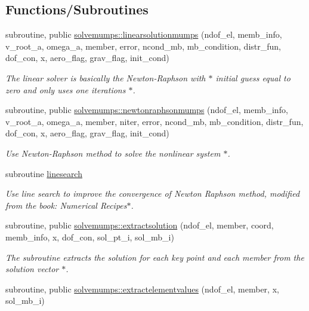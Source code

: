 \subsection*{Functions/\+Subroutines}
\begin{DoxyCompactItemize}
\item 
subroutine, public \hyperlink{namespacesolvemumps_aad7849d30a944c0bd614bf4e103ef494}{solvemumps\+::linearsolutionmumps} (ndof\+\_\+el, memb\+\_\+info, v\+\_\+root\+\_\+a, omega\+\_\+a, member, error, ncond\+\_\+mb, mb\+\_\+condition, distr\+\_\+fun, dof\+\_\+con, x, aero\+\_\+flag, grav\+\_\+flag, init\+\_\+cond)
\begin{DoxyCompactList}\small\item\em The linear solver is basically the Newton-\/\+Raphson with $\ast$ initial guess equal to zero and only uses one iterations $\ast$. \end{DoxyCompactList}\item 
subroutine, public \hyperlink{namespacesolvemumps_a243ff65847b437ecb22933d782df2db4}{solvemumps\+::newtonraphsonmumps} (ndof\+\_\+el, memb\+\_\+info, v\+\_\+root\+\_\+a, omega\+\_\+a, member, niter, error, ncond\+\_\+mb, mb\+\_\+condition, distr\+\_\+fun, dof\+\_\+con, x, aero\+\_\+flag, grav\+\_\+flag, init\+\_\+cond)
\begin{DoxyCompactList}\small\item\em Use Newton-\/\+Raphson method to solve the nonlinear system $\ast$. \end{DoxyCompactList}\item 
subroutine \hyperlink{_solve_mumps_8f90_abd8e42559d02f73ced63544359b8b6a9}{linesearch}
\begin{DoxyCompactList}\small\item\em Use line search to improve the convergence of Newton Raphson method, modified from the book\+: Numerical Recipes$\ast$. \end{DoxyCompactList}\item 
subroutine, public \hyperlink{namespacesolvemumps_aaa9b81bc0ea43f279abc42c729140761}{solvemumps\+::extractsolution} (ndof\+\_\+el, member, coord, memb\+\_\+info, x, dof\+\_\+con, sol\+\_\+pt\+\_\+i, sol\+\_\+mb\+\_\+i)
\begin{DoxyCompactList}\small\item\em The subroutine extracts the solution for each key point and each member from the solution vector $\ast$. \end{DoxyCompactList}\item 
subroutine, public \hyperlink{namespacesolvemumps_ae4f9a2e645ae55a030964764cf5b0218}{solvemumps\+::extractelementvalues} (ndof\+\_\+el, member, x, sol\+\_\+mb\+\_\+i)

\end{DoxyCompactItemize}
